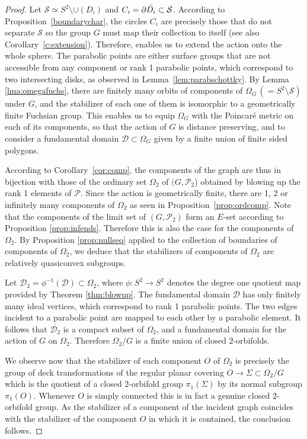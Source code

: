 \documentclass[11pt]{article}
\theoremstyle{definition}
\newcommand\PP{\mathcal{P}}
\newcommand{\cD}{\mathcal{D}}
\begin{document}
\begin{proof}  Let $\mathcal{S} \simeq 
S^2 \setminus \cup(D_i)$ and $C_i=\partial\Bar{D_i}\subset \mathcal{S}$. 
According to Proposition~\ref{boundarychar}, 
the circles $C_i$ are precisely those that do not separate $\mathcal{S}$ so the group $G$ must map their collection to itself (see also Corollary~\ref{c:extension}).
Therefore,
\cite[Thm. 5.8]{ph:unifplanar} enables us to extend the action onto the whole sphere. The parabolic points are either surface groups that are not accessible from any  component
or rank 1 parabolic points, which correspond to two intersecting disks, as observed in Lemma~\ref{lem:parabschottky}. 
By Lemma \ref{lma:omegafuchs}, there are finitely many orbits of components of $\Omega_G \,(= S^2\setminus \mathcal{S})$ under $G$, and the stabilizer of each one of them is isomorphic
to a geometrically finite Fuchsian group. This enables us to equip $\Omega_G$ with the Poincar\'e metric on each of its components, so that the action of $G$
is distance preserving, and to consider
a fundamental domain $\cD\subset \Omega_G$ given by a finite union of finite sided polygons.

According to Corollary~\ref{cor:comp}, the components of the graph are thus in bijection with those of the 
ordinary set $\Omega_2$ of $(G,\PP_2$) obtained by blowing up the rank 1 elements of $\PP$. Since the action is geometrically finite, there
are 1, 2 or infinitely many components of $\Omega_2$ as seen in Proposition~\ref{prop:ordcomp}.  Note that the components of the limit set of $(G,\PP_2)$ 
form an $E$-set according to Proposition \ref{prop:infends}. Therefore this is also the case for the components of $\Omega_2$.
By Proposition \ref{prop:nullseq} applied to the collection of boundaries of components of $\Omega_2$, 
we deduce that the stabilizers of  components of $\Omega_2$ are relatively quasiconvex subgroups.  

Let $\cD_2=\phi^{-1}(\cD)\subset \Omega_2$,  where $\phi:S^2\to S^2$ denotes  the degree one quotient map provided by Theorem \ref{thm:blowup}. The fundamental domain $\cD$ has only finitely many
ideal vertices, which correspond to rank 1 parabolic points. 
The two edges incident to a parabolic point are mapped to each other by a parabolic element.
It follows that $\overline{\cD_2}$ is a compact subset of $\Omega_2$, and a fundamental domain
for the action of $G$ on $\Omega_2$. Therefore $\Omega_2/G$ is a finite union of closed $2$-orbifolds.

We observe now that the stabilizer of each component $O$ of $\Omega_2$ is precisely the group of deck transformations of the regular planar covering $O\to \Sigma\subset\Omega_2/G$ 
which is the quotient of a closed $2$-orbifold group $\pi_1(\Sigma)$ by its normal subgroup $\pi_1(O)$. Whenever $O$ is simply connected this is in fact a genuine closed 
$2$-orbifold group. As the stabilizer of a component of the incident graph coincides with the stabilizer of the component $O$ in which it is contained, the conclusion follows.
\end{proof}
\end{document}
